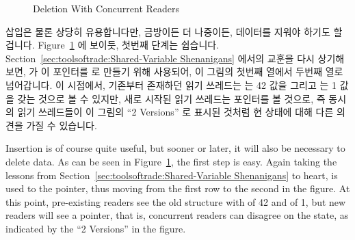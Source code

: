 \begin{figure}[tb]
\centering
{}
\caption{Deletion With Concurrent Readers}
\label{fig:defer:Deletion With Concurrent Readers}
\end{figure}

삽입은 물론 상당히 유용합니다만, 금방이든 더 나중이든, 데이터를 지워야 하기도
할 겁니다.
Figure~\ref{fig:defer:Deletion With Concurrent Readers}
에 보이듯, 첫번째 단계는 쉽습니다.
Section~\ref{sec:toolsoftrade:Shared-Variable Shenanigans}
에서의 교훈을 다시 상기해 보면,  가 이 포인터를
 로 만들기 위해 사용되어, 이 그림의 첫번째 열에서 두번째 열로
넘어갑니다.
이 시점에서, 기존부터 존재하던 읽기 쓰레드는  는 42 값을 그리고
 는 1 값을 갖는 것으로 볼 수 있지만, 새로 시작된 읽기 쓰레드는
 포인터를 볼 것으로, 즉 동시의 읽기 쓰레드들이 이 그림의 ``2
Versions'' 로 표시된 것처럼 현 상태에 대해 다른 의견을 가질 수 있습니다.

\iffalse

Insertion is of course quite useful, but sooner or later, it will also
be necessary to delete data.
As can be seen in
Figure~\ref{fig:defer:Deletion With Concurrent Readers},
the first step is easy.
Again taking the lessons from
Section~\ref{sec:toolsoftrade:Shared-Variable Shenanigans}
to heart,  is used to  the pointer,
thus moving from the first row to the second in the figure.
At this point, pre-existing readers see the old structure with
 of 42 and  of 1, but new readers will see
a  pointer, that is, concurrent readers can disagree on
the state, as indicated by the ``2 Versions'' in the figure.

